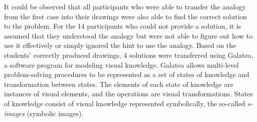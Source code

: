 \documentclass[12pt]{article}
\begin{document}
It could be observed that all participants who were able to transfer the analogy from the first case into their drawings were also able to find the correct solution to the problem. For the 14 participants who could not provide a solution, it is assumed that they understood the analogy but were not able to figure out how to use it effectively or simply ignored the hint to use the analogy. Based on the students' correctly produced drawings, 4 solutions were transferred using Galatea, a software program for modeling visual knowledge. Galatea allows multi-level problem-solving procedures to be represented as a set of states of knowledge and transformation between states. The elements of each state of knowledge are instances of visual elements, and the operations are visual transformations.  States of knowledge consist of visual knowledge represented symbolically, the so-called \textit{s-images} (symbolic images). 
\end{document}
